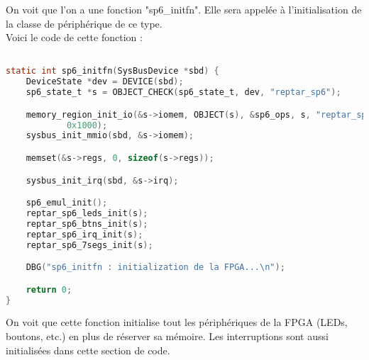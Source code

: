 On voit que l'on a une fonction "sp6\_initfn". Elle sera appelée à l'initialisation de la classe de périphérique de ce type.\\
\pagebreak
Voici le code de cette fonction :  
\begin{lstlisting}[language=C,caption=Device initialization]

static int sp6_initfn(SysBusDevice *sbd) {
	DeviceState *dev = DEVICE(sbd);
	sp6_state_t *s = OBJECT_CHECK(sp6_state_t, dev, "reptar_sp6");

	memory_region_init_io(&s->iomem, OBJECT(s), &sp6_ops, s, "reptar_sp6",
			0x1000);
	sysbus_init_mmio(sbd, &s->iomem);

	memset(&s->regs, 0, sizeof(s->regs));

	sysbus_init_irq(sbd, &s->irq);

	sp6_emul_init();
	reptar_sp6_leds_init(s);
	reptar_sp6_btns_init(s);
	reptar_sp6_irq_init(s);
	reptar_sp6_7segs_init(s);

	DBG("sp6_initfn : initialization de la FPGA...\n");

	return 0;
}
\end{lstlisting}

On voit que cette fonction initialise tout les périphériques de la FPGA (LEDs, boutons, etc.) en plus de réserver sa mémoire. Les interruptions sont aussi initialisées dans cette section de code.\\

